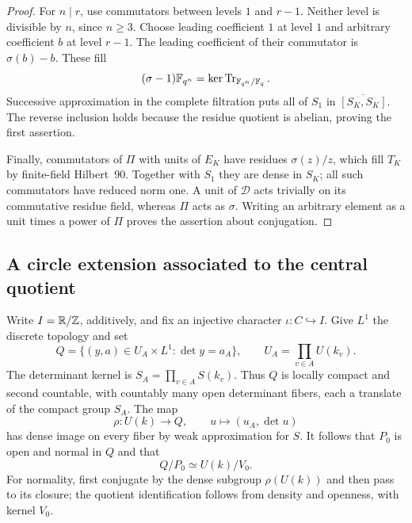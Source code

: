 \begin{proof}
For $n\mid r$, use commutators between levels $1$ and $r-1$.
Neither level is divisible by $n$, since $n\geq3$.  Choose leading
coefficient $1$ at level $1$ and arbitrary coefficient $b$ at
level $r-1$.  The leading coefficient of their commutator is
$\sigma(b)-b$.  These fill
\[
 (\sigma-1)\mathbb F_{q^n}=\ker\operatorname{Tr}_{\mathbb F_{q^n}/\mathbb F_q}.
\]
Successive approximation in the complete filtration puts all of
$S_1$ in $\overline{[S_K,S_K]}$.  The reverse inclusion holds because
the residue quotient is abelian, proving the first assertion.

Finally, commutators of $\Pi$ with units of $E_K$ have residues
$\sigma(z)/z$, which fill $T_K$ by finite-field Hilbert~90.
Together with $S_1$ they are dense in $S_K$; all such commutators
have reduced norm one.  A unit of $\mathcal D$ acts trivially on
its commutative residue field, whereas $\Pi$ acts as $\sigma$.
Writing an arbitrary element as a unit times a power of $\Pi$
proves the assertion about conjugation.
\end{proof}

\subsection{A circle extension associated to the central quotient}

Write $I=\mathbb R/\mathbb Z$, additively, and fix an injective character
$\iota:C\hookrightarrow I$.  Give $L^1$ the discrete topology and set
\begin{equation}\label{quo:determinant-group}
 Q=\{(y,a)\in U_A\times L^1:\det y=a_A\},
 \qquad U_A=\prod_{v\in A}U(k_v).
\end{equation}
The determinant kernel is $S_A=\prod_{v\in A}S(k_v)$.
Thus $Q$ is locally compact and second countable, with countably many
open determinant fibers, each a translate of the compact group $S_A$.
The map
\[
 \rho:U(k)\longrightarrow Q,
 \qquad u\longmapsto(u_A,\det u)
\]
has dense image on every fiber by weak approximation for $S$.
It follows that $P_0$ is open and normal in $Q$ and that
\begin{equation}\label{quo:discrete-quotient}
 Q/P_0\simeq U(k)/V_0.
\end{equation}
For normality, first conjugate by the dense subgroup $\rho(U(k))$
and then pass to its closure; the quotient identification follows
from density and openness, with kernel $V_0$.

